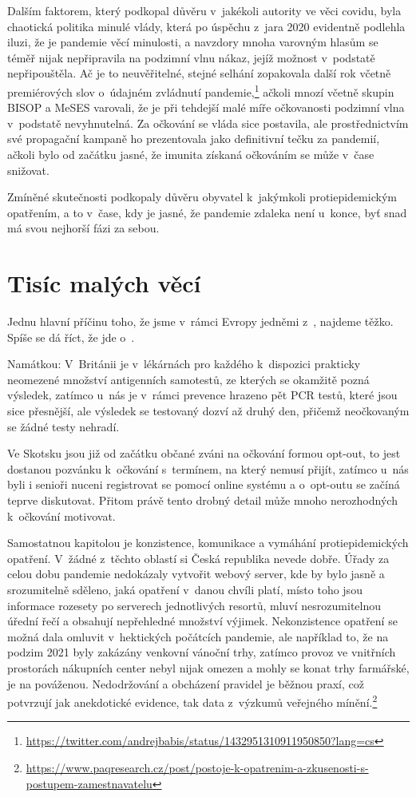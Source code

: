 Dalším faktorem, který podkopal důvěru v~jakékoli  autority ve věci covidu, byla chaotická politika minulé vlády, která po úspěchu z~jara 2020 evidentně podlehla iluzi, že je pandemie věcí minulosti, a navzdory mnoha varovným hlasům se téměř nijak nepřipravila na podzimní vlnu nákaz, jejíž možnost v~podstatě nepřipouštěla. Ač je to neuvěřitelné, stejné selhání zopakovala další rok včetně premiérových slov o~údajném zvládnutí pandemie,\footnote{\url{https://twitter.com/andrejbabis/status/1432951310911950850?lang=cs}} ačkoli mnozí včetně skupin BISOP a MeSES varovali, že je při tehdejší malé míře očkovanosti podzimní vlna v~podstatě nevyhnutelná. Za očkování se vláda sice postavila, ale prostřednictvím své propagační kampaně ho prezentovala jako definitivní tečku za pandemií, ačkoli bylo od začátku jasné, že imunita získaná očkováním se může v~čase snižovat. 

Zmíněné skutečnosti podkopaly důvěru obyvatel k~jakýmkoli protiepidemickým opatřením, a to v~čase, kdy je jasné, že pandemie zdaleka není u~konce, byť snad má svou nejhorší fázi za sebou.

\section*{Tisíc malých věcí}

Jednu hlavní příčinu toho, že jsme v~rámci Evropy jedněmi z~, najdeme těžko. Spíše se dá říct, že jde o~.

Namátkou: V~Británii je v~lékárnách pro každého k~dispozici prakticky neomezené množství antigenních samotestů, ze kterých se okamžitě pozná výsledek, zatímco u~nás je v~rámci prevence hrazeno pět PCR testů, které jsou sice přesnější, ale výsledek se testovaný dozví až druhý den, přičemž neočkovaným se žádné testy nehradí. 

Ve Skotsku jsou již od začátku občané zváni na očkování formou opt-out, to jest dostanou pozvánku k~očkování s~termínem, na který nemusí přijít, zatímco u~nás byli i senioři nuceni registrovat se pomocí online systému a o~opt-outu se začíná teprve diskutovat. Přitom právě tento drobný detail může mnoho nerozhodných k~očkování motivovat.

Samostatnou kapitolou je konzistence, komunikace a vymáhání protiepidemických opatření. V~žádné z~těchto oblastí si Česká republika nevede dobře. Úřady za celou dobu pandemie nedokázaly vytvořit webový server, kde by bylo jasně a srozumitelně sděleno, jaká opatření v~danou chvíli platí, místo toho jsou informace rozesety po serverech jednotlivých resortů, mluví nesrozumitelnou úřední řečí a obsahují nepřehledné množství výjimek. Nekonzistence opatření se možná dala omluvit v~hektických počátcích pandemie, ale například to, že na podzim 2021 byly zakázány venkovní vánoční trhy, zatímco provoz ve vnitřních prostorách nákupních center nebyl nijak omezen a mohly se konat trhy farmářské, je na pováženou. Nedodržování a obcházení pravidel je běžnou praxí, což potvrzují jak anekdotické evidence, tak data z~výzkumů veřejného mínění.\footnote{\url{https://www.paqresearch.cz/post/postoje-k-opatrenim-a-zkusenosti-s-postupem-zamestnavatelu}}


